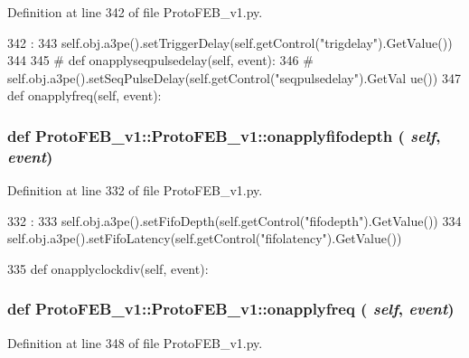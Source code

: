 Definition at line 342 of file ProtoFEB\_\-v1.py.


\begin{DoxyCode}
342                                  :
343         self.obj.a3pe().setTriggerDelay(self.getControl("trigdelay").GetValue())
344 
345 #    def onapplyseqpulsedelay(self, event):
346 #        self.obj.a3pe().setSeqPulseDelay(self.getControl("seqpulsedelay").GetVal
      ue())
347 
    def onapplyfreq(self, event):
\end{DoxyCode}
\hypertarget{classProtoFEB__v1_1_1ProtoFEB__v1_a210230166c3b08f98d003c48097d8215}{
\subsubsection[{onapplyfifodepth}]{\setlength{\rightskip}{0pt plus 5cm}def ProtoFEB\_\-v1::ProtoFEB\_\-v1::onapplyfifodepth ( {\em self}, \/   {\em event})}}
\label{classProtoFEB__v1_1_1ProtoFEB__v1_a210230166c3b08f98d003c48097d8215}


Definition at line 332 of file ProtoFEB\_\-v1.py.


\begin{DoxyCode}
332                                      :
333         self.obj.a3pe().setFifoDepth(self.getControl("fifodepth").GetValue())
334         self.obj.a3pe().setFifoLatency(self.getControl("fifolatency").GetValue())
      
335 
    def onapplyclockdiv(self, event):
\end{DoxyCode}
\hypertarget{classProtoFEB__v1_1_1ProtoFEB__v1_a81f03fc9acd5375e77012ef3680dd306}{
\subsubsection[{onapplyfreq}]{\setlength{\rightskip}{0pt plus 5cm}def ProtoFEB\_\-v1::ProtoFEB\_\-v1::onapplyfreq ( {\em self}, \/   {\em event})}}
\label{classProtoFEB__v1_1_1ProtoFEB__v1_a81f03fc9acd5375e77012ef3680dd306}


Definition at line 348 of file ProtoFEB\_\-v1.py.


